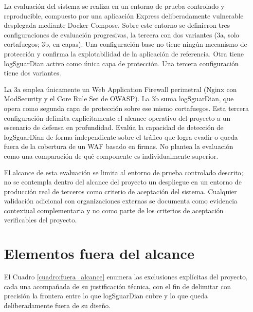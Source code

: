 La evaluación del sistema se realiza en un entorno de prueba controlado y reproducible, compuesto por una aplicación Express deliberadamente vulnerable desplegada mediante Docker Compose. Sobre este entorno se definieron tres configuraciones de evaluación progresivas, la tercera con dos variantes (3a, solo cortafuegos; 3b, en capas). Una configuración base no tiene ningún mecanismo de protección y confirma la explotabilidad de la aplicación de referencia. Otra tiene logSguarDian activo como única capa de protección. Una tercera configuración tiene dos variantes.

La 3a emplea únicamente un Web Application Firewall perimetral (Nginx con ModSecurity y el Core Rule Set de OWASP). La 3b suma logSguarDian, que opera como segunda capa de protección sobre ese mismo cortafuegos. Esta tercera configuración delimita explícitamente el alcance operativo del proyecto a un escenario de defensa en profundidad. Evalúa la capacidad de detección de logSguarDian de forma independiente sobre el tráfico que logra evadir o queda fuera de la cobertura de un WAF basado en firmas. No plantea la evaluación como una comparación de qué componente es individualmente superior.

El alcance de esta evaluación se limita al entorno de prueba controlado descrito; no se contempla dentro del alcance del proyecto un despliegue en un entorno de producción real de terceros como criterio de aceptación del sistema. Cualquier validación adicional con organizaciones externas se documenta como evidencia contextual complementaria y no como parte de los criterios de aceptación verificables del proyecto.

\section{Elementos fuera del alcance}

El Cuadro \ref{cuadro:fuera_alcance} enumera las exclusiones explícitas del proyecto, cada una acompañada de su justificación técnica, con el fin de delimitar con precisión la frontera entre lo que logSguarDian cubre y lo que queda deliberadamente fuera de su diseño.

